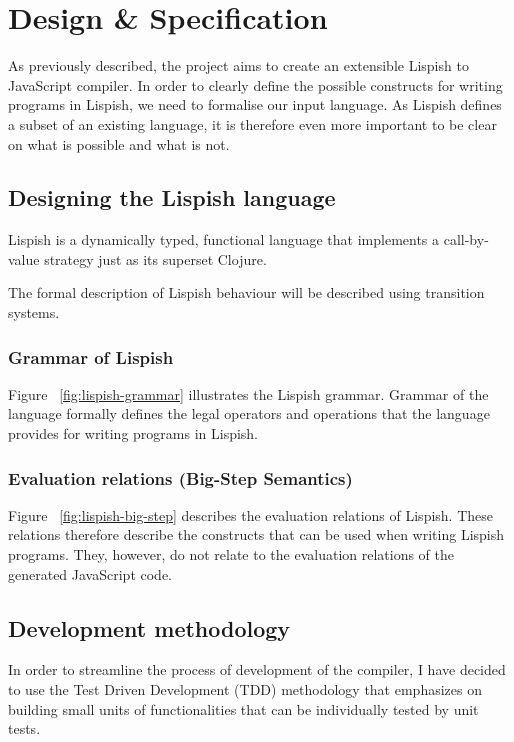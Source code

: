 \chapter{Design \& Specification}

As previously described, the project aims to create an extensible Lispish to JavaScript compiler. 
In order to clearly define the possible constructs for writing programs in Lispish, we need to formalise our input language. 
As Lispish defines a subset of an existing language, it is therefore even more important to be clear on what is possible and what is not. 

\section{Designing the Lispish language}

Lispish is a dynamically typed, functional language that implements a call-by-value strategy just as its superset Clojure.

The formal description of Lispish behaviour will be described using transition systems.

\subsection{Grammar of Lispish}



Figure ~\ref{fig:lispish-grammar} illustrates the Lispish grammar. Grammar of the language formally defines the legal operators and operations that the language provides for writing programs in Lispish.

\subsection{Evaluation relations (Big-Step Semantics)}

Figure ~\ref{fig:lispish-big-step} describes the evaluation relations of Lispish. These relations therefore describe the constructs that can be used when writing Lispish programs. They, however, do not relate to the evaluation relations of the generated JavaScript code. 



\section{Development methodology}
In order to streamline the process of development of the compiler, I have decided to use the Test Driven Development (TDD) methodology that emphasizes on building small units of functionalities that can be individually tested by unit tests. 

